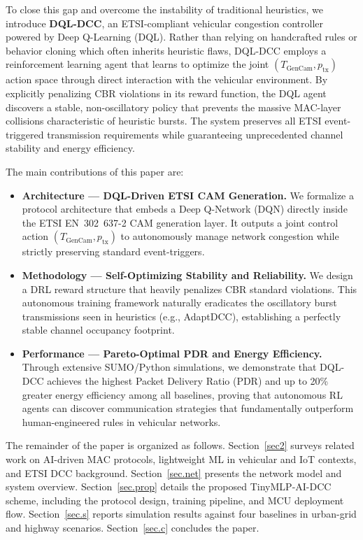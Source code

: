 \documentclass[journal]{IEEEtran}
\begin{document}
To close this gap and overcome the instability of traditional heuristics,
we introduce \textbf{DQL-DCC}, an ETSI-compliant vehicular congestion controller
powered by Deep Q-Learning (DQL). Rather than relying on handcrafted rules
or behavior cloning which often inherits heuristic flaws, DQL-DCC employs a
reinforcement learning agent that learns to optimize the joint
$(T_{\text{GenCam}}, p_{\text{tx}})$ action space through direct interaction
with the vehicular environment. By explicitly penalizing CBR violations in its
reward function, the DQL agent discovers a stable, non-oscillatory policy that
prevents the massive MAC-layer collisions characteristic of heuristic bursts.
The system preserves all ETSI event-triggered transmission requirements while
guaranteeing unprecedented channel stability and energy efficiency.

The main contributions of this paper are:

\begin{itemize}[leftmargin=2em]
  \item[\textbf{C1}] \textbf{Architecture --- DQL-Driven ETSI CAM Generation.}
    We formalize a protocol architecture that embeds a Deep Q-Network (DQN)
    directly inside the ETSI EN~302~637-2 CAM generation layer. It outputs
    a joint control action $(T_{\text{GenCam}}, p_{\text{tx}})$ to autonomously
    manage network congestion while strictly preserving standard event-triggers.
  \item[\textbf{C2}] \textbf{Methodology --- Self-Optimizing Stability and Reliability.}
    We design a DRL reward structure that heavily penalizes CBR standard violations.
    This autonomous training framework naturally eradicates the oscillatory burst
    transmissions seen in heuristics (e.g., AdaptDCC), establishing a perfectly
    stable channel occupancy footprint.
  \item[\textbf{C3}] \textbf{Performance --- Pareto-Optimal PDR and Energy Efficiency.}
    Through extensive SUMO/Python simulations, we demonstrate that DQL-DCC
    achieves the highest Packet Delivery Ratio (PDR) and up to 20\% greater
    energy efficiency among all baselines, proving that autonomous RL agents
    can discover communication strategies that fundamentally outperform
    human-engineered rules in vehicular networks.
\end{itemize}

The remainder of the paper is organized as follows.
Section~\ref{sec2} surveys related work on AI-driven MAC protocols,
lightweight ML in vehicular and IoT contexts, and ETSI DCC background.
Section~\ref{sec.net} presents the network model and system overview.
Section~\ref{sec.prop} details the proposed TinyMLP-AI-DCC scheme,
including the protocol design, training pipeline, and MCU deployment
flow.  Section~\ref{sec.s} reports simulation results against four
baselines in urban-grid and highway scenarios.
Section~\ref{sec.c} concludes the paper.
\end{document}
